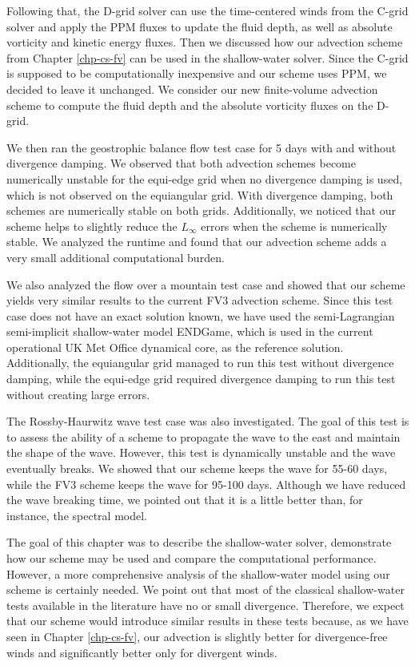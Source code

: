 Following that, the D-grid solver can use the time-centered winds from the C-grid solver and apply the PPM fluxes to update the fluid depth,
as well as absolute vorticity and kinetic energy fluxes. 
Then we discussed how our advection scheme from Chapter \ref{chp-cs-fv} can be used in the shallow-water solver. 
Since the C-grid is supposed to be computationally inexpensive and our scheme uses PPM, we decided to leave it unchanged. 
We consider our new finite-volume advection scheme to compute the fluid depth and the absolute vorticity fluxes on the D-grid.

We then ran the geostrophic balance flow test case for 5 days with and without divergence damping.
We observed that both advection schemes become numerically unstable for the equi-edge grid when no divergence damping is used,
which is not observed on the equiangular grid.
With divergence damping, both schemes are numerically stable on both grids.
Additionally, we noticed that our scheme helps to slightly reduce the $L_{\infty}$ errors when the scheme is numerically stable.
We analyzed the runtime and found that our advection scheme adds a very small additional computational burden.

We also analyzed the flow over a mountain test case and showed that our scheme yields very similar results to the current FV3 advection scheme.
Since this test case does not have an exact solution known, we have used the semi-Lagrangian semi-implicit shallow-water model ENDGame, 
which is used in the current operational UK Met Office dynamical core, as the reference solution.
Additionally, the equiangular grid managed to run this test without divergence damping,
while the equi-edge grid required divergence damping to run this test without creating large errors.

The Rossby-Haurwitz wave test case was also investigated. 
The goal of this test is to assess the ability of a scheme to propagate the wave to the east and maintain the shape of the wave. 
However, this test is dynamically unstable and the wave eventually breaks. 
We showed that our scheme keeps the wave for 55-60 days, while the FV3 scheme keeps the wave for 95-100 days. 
Although we have reduced the wave breaking time, we pointed out that it is a little better than, for instance, the spectral model.

The goal of this chapter was to describe the shallow-water solver, demonstrate how our scheme may be used and compare the computational performance.
However, a more comprehensive analysis of the shallow-water model using our scheme is certainly needed. 
We point out that most of the classical shallow-water tests available in the literature \citep{will:1992, galewsky:2004} have no or small divergence. 
Therefore, we expect that our scheme would introduce similar results in these tests because,
 as we have seen in Chapter \ref{chp-cs-fv}, our advection is slightly better for divergence-free winds and  significantly better only for divergent winds.
